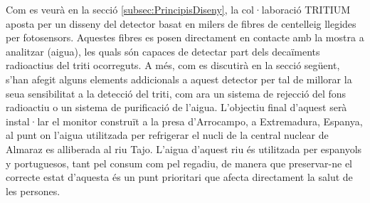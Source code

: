 Com es veurà en la secció \ref{subsec:PrincipisDiseny}, la col·laboració TRITIUM aposta per un disseny del detector basat en milers de fibres de centelleig llegides per fotosensors. Aquestes fibres es posen directament en contacte amb la mostra a analitzar (aigua), les quals són capaces de detectar part dels decaïments radioactius del triti ocorreguts. A més, com es discutirà en la secció següent, s'han afegit alguns elements addicionals a aquest detector per tal de millorar la seua sensibilitat a la detecció del triti, com ara un sistema de rejecció del fons radioactiu o un sistema de purificació de l'aigua. L'objectiu final d'aquest serà instal·lar el monitor construït a la presa d'Arrocampo, a Extremadura, Espanya, al punt on l'aigua utilitzada per refrigerar el nucli de la central nuclear de Almaraz es alliberada al riu Tajo. L'aigua d'aquest riu és utilitzada per espanyols y portuguesos, tant pel consum com pel regadiu, de manera que preservar-ne el correcte estat d'aquesta és un punt prioritari que afecta directament la salut de les persones. 